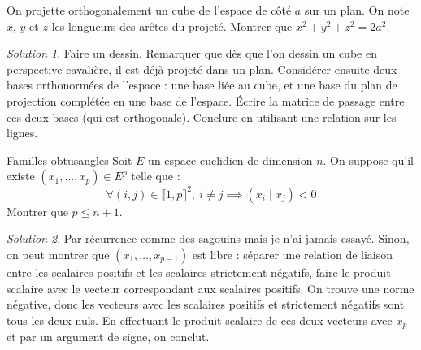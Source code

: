 \documentclass[french]{book}
\theoremstyle{definition}
\theoremstyle{remark}
\newtheorem*{sol}{Solution}
\begin{document}
\begin{exo}[2]{}
	On projette orthogonalement un cube de l'espace de côté $a$ sur un plan. On note $x$, $y$ et $z$ les longueurs des arêtes du projeté. Montrer que $x^2+y^2+z^2=2a^2$.
\end{exo}
\begin{sol}
	Faire un dessin. Remarquer que dès que l'on dessin un cube en perspective cavalière, il est déjà projeté dans un plan. Considérer ensuite deux bases orthonormées de l'espace : une base liée au cube, et une base du plan de projection complétée en une base de l'espace. Écrire la matrice de passage entre ces deux bases (qui est orthogonale). Conclure en utilisant une relation sur les lignes. 
\end{sol}

\begin{exo}[2]{Familles obtusangles}
	Soit $E$ un espace euclidien de dimension $n$. On suppose qu'il existe $(x_1,\ldots,x_p)\in E^{p}$ telle que : $$\forall (i,j)\in\llbracket1,p\rrbracket^2,\ i\ne j\implies (x_i\mid x_j)<0$$ Montrer que $p\leqslant n+1$.
\end{exo}
\begin{sol}
	Par récurrence comme des sagouins mais je n'ai jamais essayé. Sinon, on peut montrer que $(x_1,\ldots,x_{p-1})$ est libre : séparer une relation de liaison entre les scalaires positifs et les scalaires strictement négatifs, faire le produit scalaire avec le vecteur correspondant aux scalaires positifs. On trouve une norme négative, donc les vecteurs avec les scalaires positifs et strictement négatifs sont tous les deux nuls. En effectuant le produit scalaire de ces deux vecteurs avec $x_p$ et par un argument de signe, on conclut.
\end{sol}
\end{document}
